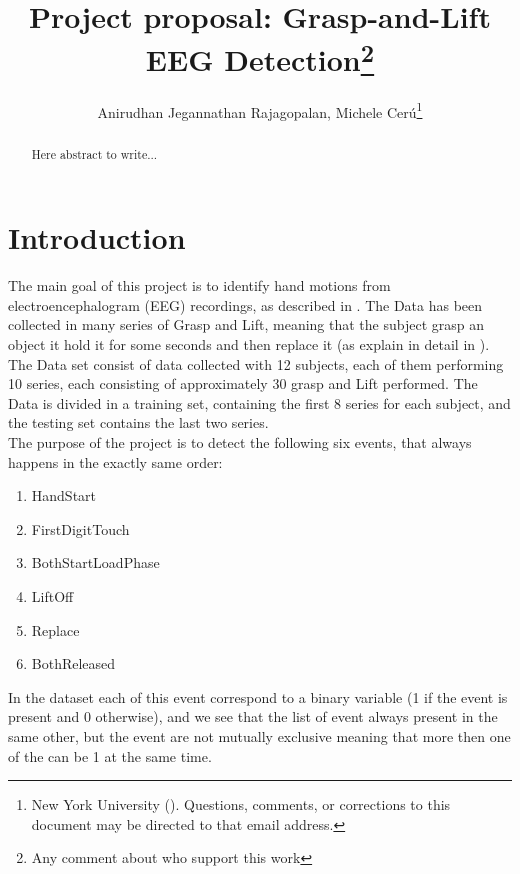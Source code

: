 \documentclass[final,leqno,onefignum,onetabnum]{siamltexmm}
\title{Project proposal: Grasp-and-Lift EEG Detection\thanks{Any comment about who support this work}}
\author{Anirudhan Jegannathan Rajagopalan, Michele Cer\'u\thanks{New York University (\email{anirudhan.jegannathan@nyu.edu; mc3784@nyu.edu}). Questions, comments, or corrections
to this document may be directed to that email address.}}
\begin{document}
\maketitle
\newcommand{\slugmaster}{%
\slugger{siads}{xxxx}{xx}{x}{x--x}}%

\begin{abstract}
Here abstract to write... 
\end{abstract}

\begin{keywords}\end{keywords}

\begin{AMS}\end{AMS}


\pagestyle{myheadings}
\thispagestyle{plain}

\section{Introduction}
The main goal of this project  is to identify hand motions from electroencephalogram (EEG) recordings, as described in \cite{kaggle}. The Data has been collected in many series of Grasp and Lift, meaning that the subject grasp an object it hold it for some seconds and then replace it (as explain in detail in \cite{experiment} ). 
The Data set consist of data collected with 12 subjects, each of them performing 10 series, each consisting of approximately 30 grasp and Lift performed. The Data is divided in a  training set, containing the first 8 series for each subject, and  the testing set contains the last two series.\\
The purpose of the project is to detect the following six events, that always happens in the exactly same order: 
\begin{enumerate} 
\item HandStart
\item FirstDigitTouch
\item BothStartLoadPhase
\item LiftOff
\item Replace
\item BothReleased
\end{enumerate}
In the dataset each of this event correspond to a binary variable (1 if the event is present and 0 otherwise), and we see that the list of event always present in the same other, but the event are not mutually exclusive meaning that more then one of the can be 1 at the same time.\\
\end{document}
